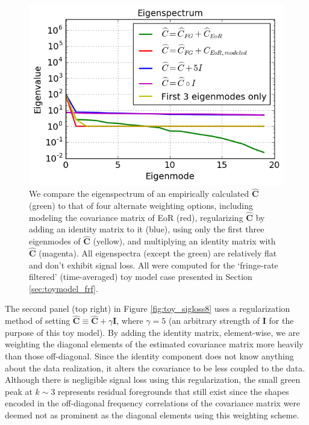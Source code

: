 \documentclass[preprint2,numberedappendix,tighten]{aastex6}  %
\begin{document}
\begin{figure}
	\centering
	\includegraphics[trim={0cm 0cm 0cm 0cm},clip,width=\columnwidth]{plots/toy_sigloss14.png}
	\caption{We compare the eigenspectrum of an empirically calculated $\widehat{\textbf{C}}$ (green) to that of four alternate 
weighting options, including modeling the covariance matrix of EoR (red), regularizing $\widehat{\textbf{C}}$ by adding an identity 
matrix to it (blue), using only the first three eigenmodes of $\widehat{\textbf{C}}$ (yellow), and multiplying an identity matrix with $
\widehat{\textbf{C}}$ (magenta). All eigenspectra (except the green) are relatively flat and don't exhibit signal loss. All were 
computed for the `fringe-rate filtered' (time-averaged) toy model case presented in Section \ref{sec:toymodel_frf}.}
	\label{fig:toy_sigloss14}
\end{figure}

The second panel (top right) in Figure \ref{fig:toy_sigloss8} uses a regularization method of setting $\widehat{\textbf{C}} \equiv 
\widehat{\textbf{C}} + \gamma\textbf{I}$, where $\gamma = 5$ (an arbitrary strength 
of $\textbf{I}$ for the purpose of this toy model). By adding the identity matrix, element-wise, we are weighting the diagonal 
elements of the estimated covariance matrix more heavily than those off-diagonal. Since the identity component does not know anything about the data realization, it alters the covariance to be less coupled to the data. Although there is negligible signal loss using this regularization, the small green peak at $k\sim3$ represents residual foregrounds that still exist since the shapes encoded in the off-diagonal frequency correlations of the covariance matrix were deemed not as prominent as the diagonal elements using this weighting scheme. 
\end{document}
